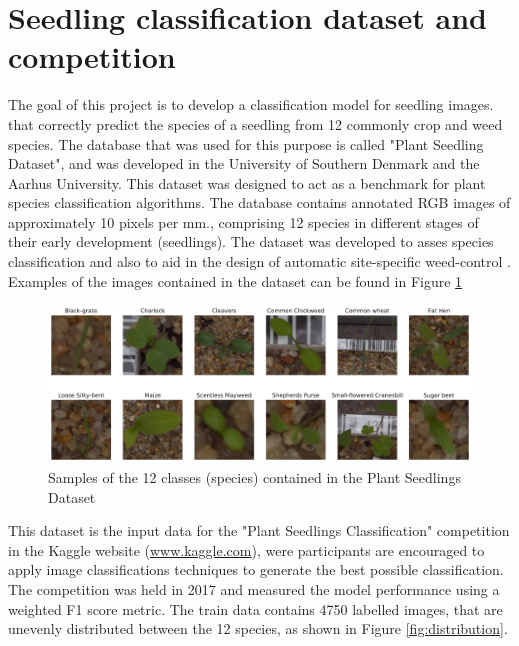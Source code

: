 \documentclass[11pt,onecolumn,titlepage,letterpaper]{article}
\begin{document}


\section{Seedling classification dataset and competition}

The goal of this project is to develop a classification model for seedling images. that correctly predict the species of a seedling from 12 commonly crop and weed species. The database that was used for this purpose is called "Plant Seedling Dataset", and was developed in the University of Southern Denmark and the Aarhus University\cite{Giselsson2017}. This dataset  was designed to act as a benchmark for plant species classification algorithms. The database contains annotated RGB images of approximately 10 pixels per mm., comprising 12 species in different stages of their early development (seedlings). The dataset was developed to asses species classification and also to aid in the design of automatic site-specific weed-control \cite{Giselsson2017}. Examples of the images contained in the dataset can be found in Figure \ref{fig:samples}

\begin{figure}[h]
	\begin{center}
		\includegraphics[width=0.9\linewidth]{samples_images.pdf}
	\end{center}
	\caption{Samples of the 12 classes (species) contained in the Plant Seedlings Dataset}
	\label{fig:samples}
\end{figure}

This dataset is the input data for the "Plant Seedlings Classification" competition in the Kaggle website (\url{www.kaggle.com}), were participants are encouraged to apply image classifications techniques to generate the best possible classification. The competition was held in 2017 and measured the model performance using a weighted F1 score metric. The train data contains 4750 labelled images, that are unevenly distributed between the 12 species, as shown in Figure \ref{fig:distribution}. 
\end{document}

